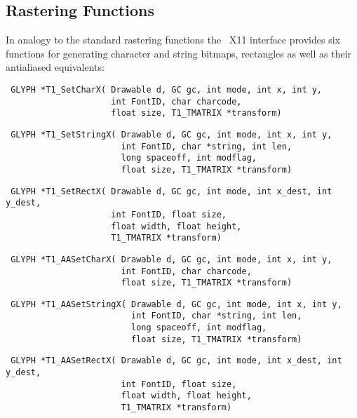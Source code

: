 \subsection{Rastering Functions}
In analogy to the standard rastering functions the \tonelib\ X11 interface
provides six functions for generating character and string bitmaps, rectangles
as well as their antialiased equivalents:
\precorr
\begin{verbatim}
 GLYPH *T1_SetCharX( Drawable d, GC gc, int mode, int x, int y,
                     int FontID, char charcode,
                     float size, T1_TMATRIX *transform)
\end{verbatim}\postcorr
\precorr
\begin{verbatim}
 GLYPH *T1_SetStringX( Drawable d, GC gc, int mode, int x, int y,
                       int FontID, char *string, int len,
                       long spaceoff, int modflag,
                       float size, T1_TMATRIX *transform)
\end{verbatim}\postcorr
\precorr 
\begin{verbatim}
 GLYPH *T1_SetRectX( Drawable d, GC gc, int mode, int x_dest, int y_dest,
                     int FontID, float size,
                     float width, float height,
                     T1_TMATRIX *transform)
\end{verbatim}\postcorr
\precorr
\begin{verbatim}
 GLYPH *T1_AASetCharX( Drawable d, GC gc, int mode, int x, int y,
                       int FontID, char charcode,
                       float size, T1_TMATRIX *transform)
\end{verbatim}\postcorr
\precorr
\begin{verbatim}
 GLYPH *T1_AASetStringX( Drawable d, GC gc, int mode, int x, int y,
                         int FontID, char *string, int len,
                         long spaceoff, int modflag,
                         float size, T1_TMATRIX *transform)
\end{verbatim}\postcorr
\precorr 
\begin{verbatim}
 GLYPH *T1_AASetRectX( Drawable d, GC gc, int mode, int x_dest, int y_dest,
                       int FontID, float size,
                       float width, float height,
                       T1_TMATRIX *transform)
\end{verbatim}\postcorr


